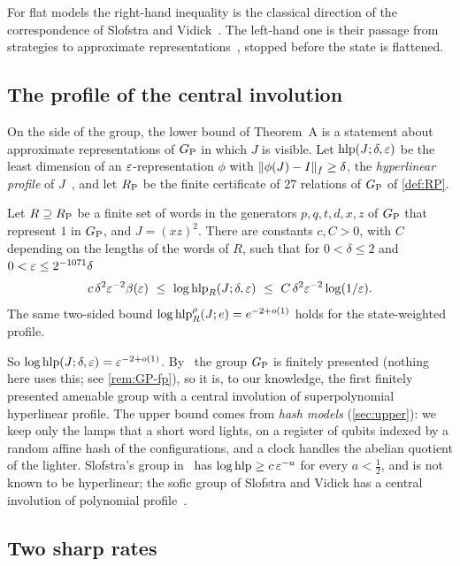 For flat models the right-hand inequality is the classical direction of the correspondence of Slofstra and
Vidick~\cite[Prop.~4.4(a)]{SV18}. The left-hand one is their passage from strategies to approximate representations~\cite[Prop.~5.4]{SV18},
stopped before the state is flattened.

\subsection{The profile of the central involution}

On the side of the group, the lower bound of Theorem~A is a statement about approximate representations of $G_{\mathrm P}$ in which $J$ is visible.
Let $\operatorname{hlp}(J;\delta,\varepsilon)$ be the least dimension of an $\varepsilon$-representation $\phi$ with $\lVert \phi(J)-I\rVert_f\ge\delta$, the \emph{hyperlinear
profile} of $J$~\cite{SV18}, and let $R_{\mathrm P}$ be the finite certificate of $27$ relations of $G_{\mathrm P}$ of \cref{def:RP}.

\begin{theoremB}
Let $R\supseteq R_{\mathrm P}$ be a finite set of words in the generators $p,q,t,d,x,z$ of $G_{\mathrm P}$ that represent $1$ in $G_{\mathrm P}$, and $J=(xz)^2$. There are
constants $c,C>0$, with $C$ depending on the lengths of the words of $R$, such that for $0<\delta\le2$ and $0<\varepsilon\le2^{-1071}\delta$
\[
c\,\delta^2\eps^{-2}\bfun(\eps)\ \le\ \log\hlp_R(J;\delta,\eps)\ \le\ C\,\delta^2\eps^{-2}\log(1/\eps).
\]
The same two-sided bound $\log\operatorname{hlp}^{\rho}_R(J;e)=e^{-2+o(1)}$ holds for the state-weighted profile.
\end{theoremB}

So $\log\operatorname{hlp}(J;\delta,\varepsilon)=\varepsilon^{-2+o(1)}$. By~\cite[Prop.~7.1]{DM-lamps} the group $G_{\mathrm P}$ is finitely presented (nothing here uses
this; see \cref{rem:GP-fp}), so it is, to our knowledge, the first finitely presented amenable group with a central involution of
superpolynomial hyperlinear profile. The upper bound comes from \emph{hash models} (\cref{sec:upper}): we keep only the
lamps that a short word lights, on a register of qubits indexed by a random affine hash of the configurations, and a clock handles the
abelian quotient of the lighter. Slofstra's group in~\cite{Slo18} has $\log\operatorname{hlp}\ge c\,\varepsilon^{-a}$ for every $a<\frac12$, and is not known to be
hyperlinear; the sofic group of Slofstra and Vidick has a central involution of polynomial profile~\cite[Prop.~3.2]{SV18}.

\subsection{Two sharp rates}

